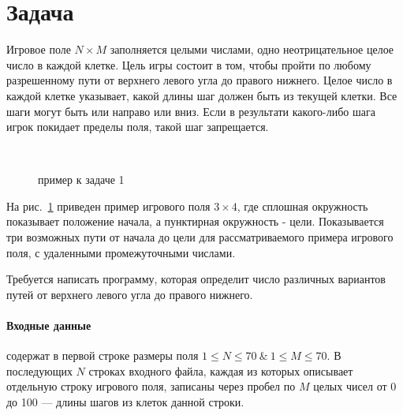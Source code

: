 \documentclass[12pt, twoside]{article}
\begin{document}
 
\section{Задача~\cite{first}}
Игровое поле $N\times M$ заполняется целыми числами, одно неотрицательное целое число в каждой клетке. Цель игры состоит в том, чтобы пройти по любому разрешенному пути от верхнего левого угла до правого нижнего. Целое число в каждой клетке указывает, какой длины шаг должен быть из текущей клетки. Все шаги могут быть или направо или вниз. Если в результати какого-либо шага игрок покидает пределы поля, такой шаг запрещается.

\begin{figure}[h!t]\center
{}
\qquad~
\qquad~
\qquad~
\caption{пример к задаче 1}
\label{task1}
\end{figure}
На рис.~\ref{task1} приведен пример игрового поля $3\times4$, где сплошная окружность показывает положение начала, а пунктирная окружность - цели. Показывается три возможных пути от начала до цели для рассматриваемого примера игрового поля, с удаленными промежуточными числами.

Требуется написать программу, которая определит число различных вариантов путей от верхнего левого угла до правого нижнего.
\paragraph{Входные данные} содержат в первой строке размеры поля $1\leq N\leq 70~\&~1\leq M\leq 70$. В последующих $N$ строках входного файла, каждая из которых описывает отдельную строку игрового поля, записаны через пробел по $M$ целых чисел от 0 до 100 --- длины шагов из клеток данной строки.
\end{document}
